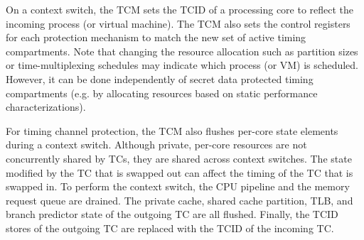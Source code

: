On a context switch, the TCM sets the TCID of a processing core to reflect
the incoming process (or virtual machine). The TCM also sets the control
registers for each protection mechanism to match the new set of active
timing compartments. Note that changing the resource allocation such as
partition sizes or time-multiplexing schedules may indicate
which process (or VM) is scheduled. However, it can be done independently
of secret data protected timing compartments (e.g. by allocating resources 
based on static performance characterizations).

For timing channel protection, the TCM also flushes per-core state elements
during a context switch.
Although private, per-core resources are not concurrently shared by TCs, they 
are shared across context switches. The state modified by the TC that is 
swapped out can affect the timing of the TC that is swapped in.
To perform the context switch, the CPU pipeline and the memory request queue 
are drained. 
The private cache, shared cache 
partition, TLB, and branch predictor state of the outgoing TC are all flushed.  
Finally, the TCID stores of the outgoing TC are replaced with the TCID of the 
incoming TC. 


